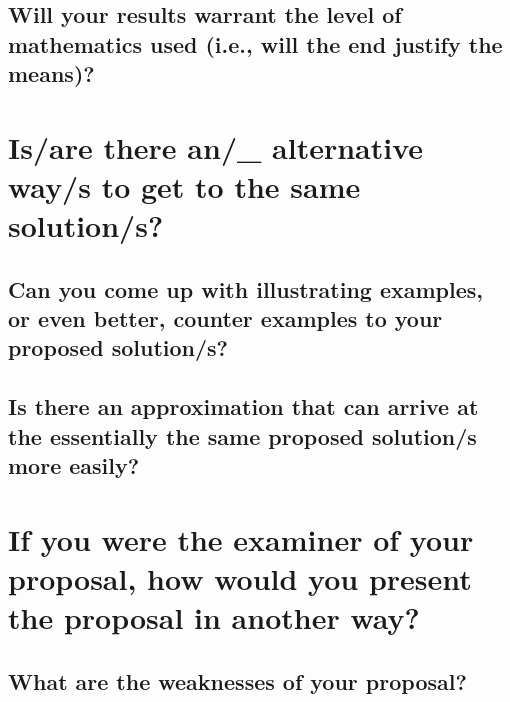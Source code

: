 \blindtext 
			
\subsection{Will your results warrant the level of mathematics used (i.e., will the end justify the means)?}
	    
\blindtext
			





\section{Is/are there an/\_ alternative way/s to get to the same solution/s?}

\blindtext
	
\subsection{Can you come up with illustrating examples, or even better, counter examples to your proposed solution/s?}

\blindtext
	
\subsection{Is there an approximation that can arrive at the essentially the same proposed solution/s more easily?}
	
\blindtext
			
	
	
	
	
\section{If you were the examiner of your proposal, how would you present the proposal in another way?}
	
\blindtext
	
	
\subsection{What are the weaknesses of your proposal?}

\blindtext
